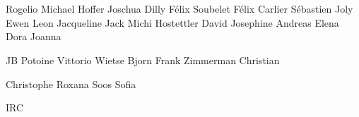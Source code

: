 \chapter{}  %


Rogelio
Michael Hoffer
Joschua Dilly
Félix Soubelet
Félix Carlier 
Sébastien Joly
Ewen
Leon 
Jacqueline
Jack
Michi Hostettler
David
Josephine
Andreas
Elena
Dora
Joanna


JB Potoine
Vittorio
Wietse
Bjorn
Frank Zimmerman
Christian

Christophe
Roxana Soos 
Sofia

IRC